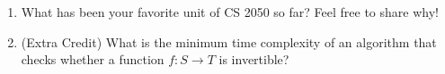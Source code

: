 \begin{enumerate}
\item What has been your favorite unit of CS 2050 so far? Feel free to share why! 

\item (Extra Credit) What is the minimum time complexity of an algorithm that checks whether a function $f:S \rightarrow T$ is invertible? 

\end{enumerate}